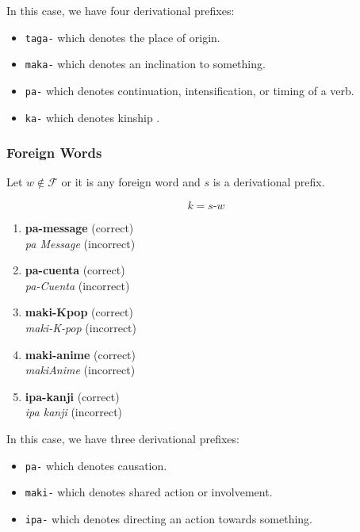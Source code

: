 In this case, we have four derivational prefixes:
\begin{itemize}
    \item \texttt{taga-} which denotes the place of origin.
    \item \texttt{maka-} which denotes an inclination to something.
    \item \texttt{pa-} which denotes continuation, intensification, or timing of a verb.
    \item \texttt{ka-} which denotes kinship .
\end{itemize}

\subsubsection{Foreign Words}
Let \(w \notin \mathcal{F}\) or it is any foreign word and $s$ is a derivational prefix.

\[
      k = s\texttt{-}w
\]

\begin{example}
\end{example}
\begin{enumerate}
      \item \textbf{pa-message} (correct) \\
            \textit{pa Message} (incorrect)
      \item \textbf{pa-cuenta} (correct) \\
            \textit{pa-Cuenta} (incorrect)
      \item \textbf{maki-Kpop} (correct) \\
            \textit{maki-K-pop} (incorrect)
      \item \textbf{maki-anime} (correct) \\
            \textit{makiAnime} (incorrect)
      \item \textbf{ipa-kanji} (correct) \\
            \textit{ipa kanji} (incorrect)
\end{enumerate}

In this case, we have three derivational prefixes:
\begin{itemize}
    \item \texttt{pa-} which denotes causation.
    \item \texttt{maki-} which denotes shared action or involvement.
    \item \texttt{ipa-} which denotes directing an action towards something.
\end{itemize}

